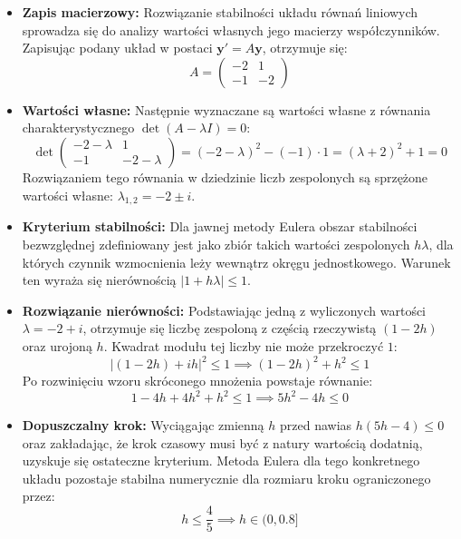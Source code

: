 \documentclass[12pt, a4paper]{article}
\begin{document}
\begin{itemize}
  \item \textbf{Zapis macierzowy:} Rozwiązanie stabilności układu równań liniowych sprowadza się do analizy wartości własnych jego macierzy współczynników. Zapisując podany układ w postaci $\mathbf{y}' = A \mathbf{y}$, otrzymuje się:
  \[
    A = \begin{pmatrix} -2 & 1 \\ -1 & -2 \end{pmatrix}
  \]

  \item \textbf{Wartości własne:} Następnie wyznaczane są wartości własne z równania charakterystycznego $\det(A - \lambda I) = 0$:
  \[
    \det \begin{pmatrix} -2-\lambda & 1 \\ -1 & -2-\lambda \end{pmatrix} = (-2-\lambda)^2 - (-1) \cdot 1 = (\lambda+2)^2 + 1 = 0
  \]
  Rozwiązaniem tego równania w dziedzinie liczb zespolonych są sprzężone wartości własne: $\lambda_{1,2} = -2 \pm i$.

  \item \textbf{Kryterium stabilności:} Dla jawnej metody Eulera obszar stabilności bezwzględnej zdefiniowany jest jako zbiór takich wartości zespolonych $h\lambda$, dla których czynnik wzmocnienia leży wewnątrz okręgu jednostkowego. Warunek ten wyraża się nierównością $|1 + h\lambda| \leq 1$. 

  \item \textbf{Rozwiązanie nierówności:} Podstawiając jedną z wyliczonych wartości $\lambda = -2 + i$, otrzymuje się liczbę zespoloną z częścią rzeczywistą $(1-2h)$ oraz urojoną $h$. Kwadrat modułu tej liczby nie może przekroczyć $1$:
  \[
    | (1-2h) + ih |^2 \leq 1 \implies (1-2h)^2 + h^2 \leq 1
  \]
  Po rozwinięciu wzoru skróconego mnożenia powstaje równanie:
  \[
    1 - 4h + 4h^2 + h^2 \leq 1 \implies 5h^2 - 4h \leq 0
  \]

  \item \textbf{Dopuszczalny krok:} Wyciągając zmienną $h$ przed nawias $h(5h - 4) \leq 0$ oraz zakładając, że krok czasowy musi być z natury wartością dodatnią, uzyskuje się ostateczne kryterium. Metoda Eulera dla tego konkretnego układu pozostaje stabilna numerycznie dla rozmiaru kroku ograniczonego przez:
  \[
    h \leq \frac{4}{5} \implies h \in (0, 0.8]
  \]
\end{itemize}

\end{document}
